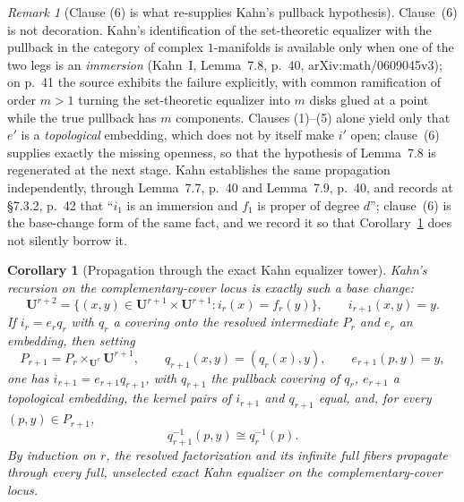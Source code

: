 \documentclass[11pt,reqno]{amsart}
\newtheorem{corollary}[theorem]{Corollary}
\theoremstyle{definition}
\theoremstyle{remark}
\newtheorem{remark}[theorem]{Remark}
\begin{document}
\begin{remark}[Clause (6) is what re-supplies Kahn's pullback hypothesis]
\label{rem:openness-regenerates-immersion}
Clause~(6) is not decoration.  Kahn's identification of the
set-theoretic equalizer with the pullback in the category of complex
\(1\)-manifolds is available only when one of the two legs is an
\emph{immersion} (Kahn~I, Lemma~7.8, p.~40, arXiv:math/0609045v3); on
p.~41 the source exhibits the failure explicitly, with common
ramification of order \(m>1\) turning the set-theoretic equalizer into
\(m\) disks glued at a point while the true pullback has \(m\)
components.  Clauses (1)--(5) alone yield only that \(e'\) is a
\emph{topological} embedding, which does not by itself make \(i'\)
open; clause~(6) supplies exactly the missing openness, so that the
hypothesis of Lemma~7.8 is regenerated at the next stage.  Kahn
establishes the same propagation independently, through Lemma~7.7,
p.~40 and Lemma~7.9, p.~40, and records at \S7.3.2, p.~42 that
``\(i_1\) is an immersion and \(f_1\) is proper of degree \(d\)'';
clause~(6) is the base-change form of the same fact, and we record it
so that Corollary~\ref{cor:kahn-tower} does not silently borrow it.
\end{remark}
\begin{corollary}[Propagation through the exact Kahn equalizer tower]\label{cor:kahn-tower}
Kahn's recursion on the complementary-cover locus is exactly such a base change:
\[
\mathbf U^{r+2}=\{(x,y)\in\mathbf U^{r+1}\times\mathbf U^{r+1}:i_r(x)=f_r(y)\},
\qquad
i_{r+1}(x,y)=y.
\]
If \(i_r=e_rq_r\) with \(q_r\) a covering onto the resolved intermediate \(P_r\) and \(e_r\) an embedding, then setting
\[
P_{r+1}=P_r\times_{\mathbf U^r}\mathbf U^{r+1},
\qquad
q_{r+1}(x,y)=(q_r(x),y),
\qquad
e_{r+1}(p,y)=y,
\]
one has \(i_{r+1}=e_{r+1}q_{r+1}\), with \(q_{r+1}\) the pullback covering of \(q_r\), \(e_{r+1}\) a topological embedding, the kernel pairs of \(i_{r+1}\) and \(q_{r+1}\) equal, and, for every \((p,y)\in P_{r+1}\),
\[
q_{r+1}^{-1}(p,y)\cong q_r^{-1}(p).
\]
By induction on \(r\), the resolved factorization and its infinite full fibers propagate through every full, unselected exact Kahn equalizer on the complementary-cover locus.
\end{corollary}
\end{document}
